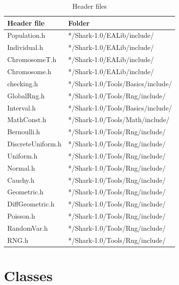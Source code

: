 \documentclass[twocolumn]{article}
\begin{document}
\begin{table}[h]
\begin{center}
\caption{Header files}
\label{Header-Table}
{\scriptsize
\begin{tabular}{|l|l|}\hline
Header file       & Folder                            \\\hline\hline
Population.h      & */Shark-1.0/EALib/include/        \\\hline
Individual.h      & */Shark-1.0/EALib/include/        \\\hline
ChromosomeT.h     & */Shark-1.0/EALib/include/        \\\hline
Chromosome.h      & */Shark-1.0/EALib/include/        \\\hline
checking.h        & */Shark-1.0/Tools/Basics/include/ \\\hline
GlobalRng.h       & */Shark-1.0/Tools/Rng/include/    \\\hline
Interval.h        & */Shark-1.0/Tools/Basics/include/ \\\hline
MathConst.h       & */Shark-1.0/Tools/Math/include/   \\\hline
Bernoulli.h       & */Shark-1.0/Tools/Rng/include/    \\\hline
DiscreteUniform.h & */Shark-1.0/Tools/Rng/include/    \\\hline
Uniform.h         & */Shark-1.0/Tools/Rng/include/    \\\hline
Normal.h          & */Shark-1.0/Tools/Rng/include/    \\\hline
Cauchy.h          & */Shark-1.0/Tools/Rng/include/    \\\hline
Geometric.h       & */Shark-1.0/Tools/Rng/include/    \\\hline
DiffGeometric.h   & */Shark-1.0/Tools/Rng/include/    \\\hline
Poisson.h         & */Shark-1.0/Tools/Rng/include/    \\\hline
RandomVar.h       & */Shark-1.0/Tools/Rng/include/    \\\hline
RNG.h             & */Shark-1.0/Tools/Rng/include/    \\\hline
\end{tabular}
}
\end{center}
\end{table}

\section{Classes}
\end{document}
